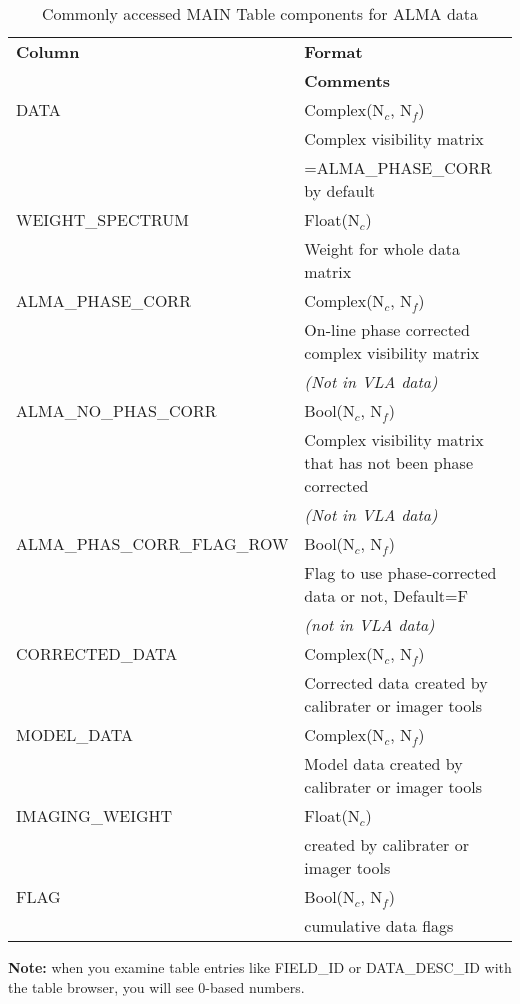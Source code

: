 \vspace{5mm}
\begin{table}[h!]
\caption[Commonly accessed MAIN Table components for ALMA data]
        {\label{tabmain}Commonly accessed MAIN Table components for ALMA data}
\begin{center}
\begin{tabular}{|ll|} \hline
  {\bf Column}      &  {\bf Format}        \\         
                    &  {\bf Comments}      \\        
  DATA              &  Complex(N$_c$, N$_f$)  \\       
                    &  Complex visibility matrix  \\
                    &  =ALMA\_PHASE\_CORR by default  \\
  WEIGHT\_SPECTRUM   &  Float(N$_c$)    \\            
                    &  Weight for whole data matrix \\     
  ALMA\_PHASE\_CORR   &  Complex(N$_c$, N$_f$) \\        
                    &  On-line phase corrected complex visibility matrix  \\
                    &  {\it (Not in VLA data)}  \\
  ALMA\_NO\_PHAS\_CORR  &  Bool(N$_c$, N$_f$)    \\     
                     & Complex visibility matrix that has not been phase corrected  \\
                     & {\it (Not in VLA data)}  \\
  ALMA\_PHAS\_CORR\_FLAG\_ROW  &  Bool(N$_c$, N$_f$)  \\
                           &  Flag to use phase-corrected data or not, Default=F  \\
                           &  {\it (not in VLA data)} \\    
  CORRECTED\_DATA   &  Complex(N$_c$, N$_f$)  \\     
                   &  Corrected data created by calibrater or imager tools \\ 
  MODEL\_DATA       &  Complex(N$_c$, N$_f$)      \\ 
                   &  Model data created by calibrater or imager tools  \\
  IMAGING\_WEIGHT   &  Float(N$_c$)  \\
                   &  created by calibrater or imager tools  \\
  FLAG             &  Bool(N$_c$, N$_f$) \\
                   &  cumulative data flags    \\
\hline
\end{tabular}
\end{center}
\end{table}
{\bf Note:} when you examine table entries like FIELD\_ID or DATA\_DESC\_ID
with the table browser, you will see 0-based numbers.


